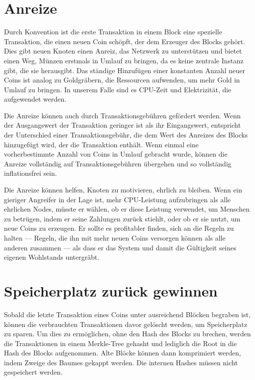 \documentclass[10pt]{article}
\begin{document}
	\section{Anreize}
	
	Durch Konvention ist die erste Transaktion in einem Block eine spezielle Transaktion, die einen neuen Coin schöpft, der dem Erzeuger des Blocks gehört. Dies gibt neuen Knoten einen Anreiz, das Netzwerk zu unterstützen und bietet einen Weg, Münzen erstmals in Umlauf zu bringen, da es keine zentrale Instanz gibt, die sie herausgibt. Das ständige Hinzufügen einer konstanten Anzahl neuer Coins ist analog zu Goldgräbern, die Ressourcen aufwenden, um mehr Gold in Umlauf zu bringen. In unserem Falle sind es CPU-Zeit und Elektrizität, die aufgewendet werden.

	Die Anreize können auch durch Transaktionsgebühren gefördert werden. Wenn der Ausgangswert der Transaktion geringer ist als ihr Eingangswert, entspricht der Unterschied einer Transaktionsgebühr, die dem Wert des Anreizes des Blocks hinzugefügt wird, der die Transaktion enthält. Wenn einmal eine vorherbestimmte Anzahl von Coins in Umlauf gebracht wurde, können die Anreize vollständig auf Transaktionsgebühren übergehen und so vollständig inflationsfrei sein.

	Die Anreize können helfen, Knoten zu motivieren, ehrlich zu bleiben. Wenn ein gieriger Angreifer in der Lage ist, mehr CPU-Leistung aufzubringen als alle ehrlichen Nodes, müsste er wählen, ob er diese Leistung verwendet, um Menschen zu betrügen, indem er seine Zahlungen zurück stiehlt, oder ob er sie nutzt, um neue Coins zu erzeugen. Er sollte es profitabler finden, sich an die Regeln zu halten — Regeln, die ihn mit mehr neuen Coins versorgen können als alle anderen zusammen — als dass er das System und damit die Gültigkeit seines eigenen Wohlstands untergräbt.

	\section{Speicherplatz zurück gewinnen}
	
	Sobald die letzte Transaktion eines Coins unter ausreichend Blöcken begraben ist, können die verbrauchten Transaktionen davor gelöscht werden, um Speicherplatz zu sparen. Um dies zu ermöglichen, ohne den Hash des Blocks zu brechen, werden die Transaktionen in einem Merkle-Tree \cite{merkle}\cite{massias}\cite{haber2} gehasht und lediglich die Root in die Hash des Blocks aufgenommen. Alte Blöcke können dann komprimiert werden, indem Zweige des Baumes gekappt werden. Die internen Hashes müssen nicht gespeichert werden.
	
\end{document}
